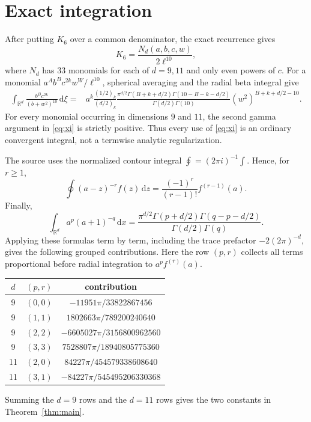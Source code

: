 \documentclass[11pt]{article}
\newcommand{\R}{\mathbb R}
\newcommand{\dd}{\,\mathrm d}
\begin{document}
\section{Exact integration}

After putting $K_6$ over a common denominator, the exact recurrence gives
\[
 K_6=\frac{N_d(a,b,c,w)}{2\ell^{10}},
\]
where $N_d$ has $33$ monomials for each of $d=9,11$ and only even powers of
$c$.  For a monomial $a^A b^B c^{2k}w^W/\ell^{10}$, spherical averaging and
the radial beta integral give
\begin{align}\label{eq:xi}
\int_{\R^d}\frac{b^Bc^{2k}}{(b+w^2)^{10}}\dd\xi
={}&a^k\frac{(1/2)_k}{(d/2)_k}
 \frac{\pi^{d/2}\Gamma(B+k+d/2)\Gamma(10-B-k-d/2)}
      {\Gamma(d/2)\Gamma(10)}
 (w^2)^{B+k+d/2-10}.
\end{align}
For every monomial occurring in dimensions $9$ and $11$, the second gamma
argument in \eqref{eq:xi} is strictly positive.  Thus every use of
\eqref{eq:xi} is an ordinary convergent integral, not a termwise analytic
regularization.

The source uses the normalized contour integral
$\oint=(2\pi i)^{-1}\int$.  Hence, for $r\geq1$,
\[
 \oint (a-z)^{-r}f(z)\dd z
   =\frac{(-1)^r}{(r-1)!}f^{(r-1)}(a).
\]
Finally,
\[
 \int_{\R^d}a^p(a+1)^{-q}\dd x
 =\frac{\pi^{d/2}\Gamma(p+d/2)\Gamma(q-p-d/2)}
        {\Gamma(d/2)\Gamma(q)}.
\]
Applying these formulas term by term, including the trace prefactor
$-2(2\pi)^{-d}$, gives the following grouped contributions.  Here the row
$(p,r)$ collects all terms proportional before radial integration to
$a^pf^{(r)}(a)$.

\begin{center}
\begin{tabular}{ccc}
\toprule
$d$ & $(p,r)$ & contribution \\
\midrule
9 & $(0,0)$ & $-11951\pi/33822867456$\\
9 & $(1,1)$ & $1802663\pi/789200240640$\\
9 & $(2,2)$ & $-6605027\pi/3156800962560$\\
9 & $(3,3)$ & $7528807\pi/18940805775360$\\
\midrule
11 & $(2,0)$ & $84227\pi/454579338608640$\\
11 & $(3,1)$ & $-84227\pi/545495206330368$\\
\bottomrule
\end{tabular}
\end{center}

Summing the $d=9$ rows and the $d=11$ rows gives the two constants in
Theorem~\ref{thm:main}.
\end{document}

